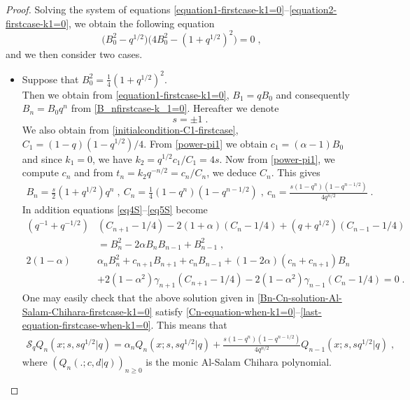 \documentclass{amsart}
\theoremstyle{remark}
\numberwithin{equation}{section}
\begin{document}
\begin{proof}
Solving the system of equations \eqref{equation1-firstcase-k1=0}--\eqref{equation2-firstcase-k1=0}, we obtain the following equation
$$\big(B_0^2-q^{1/2}\big)\big(4B_0^2 -(1+q^{1/2})^2\big)=0\;,$$
and we then consider two cases.
\begin{itemize}
\item[i-] Suppose that $B_0^2=\mbox{$\frac{1}{4}$}(1+q^{1/2})^2$.\\
Then we obtain from \eqref{equation1-firstcase-k1=0}, $B_1=qB_0$ and consequently $B_n=B_0q^n$ from \eqref{B_nfirstcase-k_1=0}. Hereafter we denote $$s=\pm 1\;.$$
We also obtain from \eqref{initialcondition-C1-firstcase}, $C_1=(1-q)(1-q^{1/2})/4$. From \eqref{power-pi1} we obtain $c_1=(\alpha-1)B_0$ and since $k_1=0$, we have $k_2=q^{1/2}c_1/C_1= 4s$. Now from \eqref{power-pi1}, we compute $c_n$ and from $t_n=k_2q^{-n/2}=c_n/C_n$, we deduce $C_n$.
This gives
\begin{align}\label{Bn-Cn-solution-Al-Salam-Chihara-firstcase-k1=0}
B_n=\frac{s}{2}(1+q^{1/2})q^n\;, ~ C_n=\frac{1}{4}(1-q^n)(1-q^{n-1/2})\;,~
c_n=\frac{s(1-q^n)(1-q^{n-1/2})}{4q^{n/2}}\;.
\end{align}
In addition equations \eqref{eq4S}--\eqref{eq5S} become
\begin{align}
(q^{-1}+q^{-1/2})&(C_{n+1}-1/4)-2(1+\alpha)(C_n-1/4)+(q+q^{1/2})(C_{n-1}-1/4)\label{Cn-equation-when-k1=0}\\
&=B_n^2-2\alpha B_nB_{n-1}+B_{n-1}^2\;,\nonumber\\
2(1-\alpha)&\alpha_nB_n^2 +c_{n+1}B_{n+1} +c_nB_{n-1}+(1-2\alpha)(c_n+c_{n+1})B_n \label{last-equation-firstcase-when-k1=0}\\ &+2(1-\alpha^2)\gamma_{n+1}(C_{n+1}-1/4)-2(1-\alpha^2)\gamma_{n-1}(C_n-1/4)=0\;.\nonumber
\end{align}
One may easily check that the above solution given in \eqref{Bn-Cn-solution-Al-Salam-Chihara-firstcase-k1=0} satisfy \eqref{Cn-equation-when-k1=0}--\eqref{last-equation-firstcase-when-k1=0}. This means that
\begin{align}\label{full-solution-Al-salam-Chihara}
\mathcal{S}_qQ_n(x;s,sq^{1/2}|q)=\alpha_nQ_n(x;s,sq^{1/2}|q)
+\frac{s(1-q^n)(1-q^{n-1/2})}{4q^{n/2}}Q_{n-1}(x;s,sq^{1/2}|q) \;,
\end{align}
where $(Q_n(.;c,d|q))_{n\geq 0}$ is the monic Al-Salam Chihara polynomial.
 

\end{itemize}
\end{proof}
\end{document}
